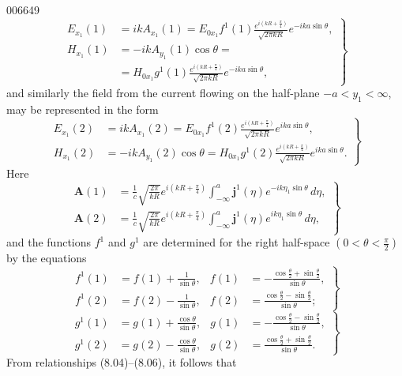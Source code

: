 \begin{scanpage}{0066}{49}
\[\left.\begin{aligned}E_{x_1}(1)&=ikA_{x_1}(1)=E_{0x_1}f^1(1)\frac{e^{i(kR+\frac\pi4)}}{\sqrt{2\pi kR}}e^{-ika\sin\theta},\\H_{x_1}(1)&=-ikA_{y_1}(1)\cos\theta=\\&=H_{0x_1}g^1(1)\frac{e^{i(kR+\frac\pi4)}}{\sqrt{2\pi kR}}e^{-ika\sin\theta},\end{aligned}\right\}\tag{8.04}\]
and similarly the field from the current flowing on the half-plane $-a<y_1<\infty$, may be represented in the form
\[\left.\begin{aligned}E_{x_1}(2)&=ikA_{x_1}(2)=E_{0x_1}f^1(2)\frac{e^{i(kR+\frac\pi4)}}{\sqrt{2\pi kR}}e^{ika\sin\theta},\\H_{x_1}(2)&=-ikA_{y_1}(2)\cos\theta=H_{0x_1}g^1(2)\frac{e^{i(kR+\frac\pi4)}}{\sqrt{2\pi kR}}e^{ika\sin\theta}.\end{aligned}\right\}\tag{8.05}\]
Here
\[\left.\begin{aligned}\mathbf A(1)&=\frac1c\sqrt{\frac{2\pi}{kR}}e^{i(kR+\frac\pi4)}\int_{-\infty}^a\mathbf j^1(\eta)e^{-ik\eta_1\sin\theta}\,d\eta,\\\mathbf A(2)&=\frac1c\sqrt{\frac{2\pi}{kR}}e^{i(kR+\frac\pi4)}\int_{-\infty}^a\mathbf j^1(\eta)e^{ik\eta_1\sin\theta}\,d\eta,\end{aligned}\right\}\tag{8.06}\]
and the functions $f^1$ and $g^1$ are determined for the right half-space $\left(0<\theta<\frac\pi2\right)$ by the equations
\[\left.\begin{aligned}f^1(1)&=f(1)+\frac1{\sin\theta},&f(1)&=-\frac{\cos\frac\theta2+\sin\frac\theta2}{\sin\theta},\\f^1(2)&=f(2)-\frac1{\sin\theta},&f(2)&=\frac{\cos\frac\theta2-\sin\frac\theta2}{\sin\theta};\end{aligned}\right\}\tag{8.07}\]
\[\left.\begin{aligned}g^1(1)&=g(1)+\frac{\cos\theta}{\sin\theta},&g(1)&=-\frac{\cos\frac\theta2-\sin\frac\theta2}{\sin\theta},\\g^1(2)&=g(2)-\frac{\cos\theta}{\sin\theta},&g(2)&=\frac{\cos\frac\theta2+\sin\frac\theta2}{\sin\theta}.\end{aligned}\right\}\tag{8.08}\]
From relationships (8.04)--(8.06), it follows that
\end{scanpage}
